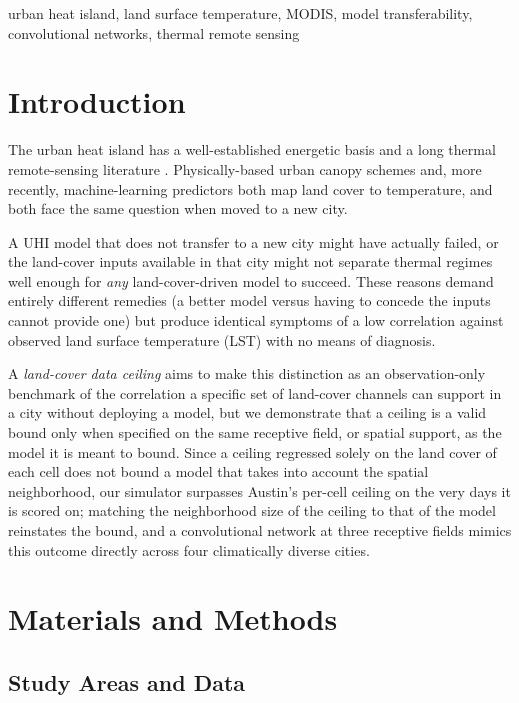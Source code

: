 \begin{IEEEkeywords}
urban heat island, land surface temperature, MODIS, model transferability,
convolutional networks, thermal remote sensing
\end{IEEEkeywords}

\section{Introduction}

The urban heat island has a well-established energetic basis
\cite{oke1982energetic} and a long thermal remote-sensing literature
\cite{voogt2003thermal}. Physically-based urban canopy schemes
\cite{masson2000physically,kusaka2001simple,bueno2013urban} and, more
recently, machine-learning predictors \cite{lyu2022integrated} both map
land cover to temperature, and both face the same question when moved to a
new city.

A UHI model that does not transfer to a new city might have actually failed, or  the land-cover inputs available in that city might not separate thermal regimes well enough for \emph{any} land-cover-driven model to succeed. These reasons demand entirely different remedies (a better model versus having to concede the inputs cannot provide one) but produce identical symptoms of a low correlation against observed land surface temperature (LST) with no means of diagnosis.

A \emph{land-cover data ceiling} aims to make this distinction as an observation-only benchmark of the correlation a specific set of land-cover channels can support in a city without deploying a model, but we demonstrate that a ceiling is a valid bound only when specified on the same receptive field, or spatial support, as the model it is meant to bound. Since a ceiling regressed solely on the land cover of each cell does not bound a model that takes into account the spatial neighborhood, our simulator surpasses Austin's per-cell ceiling on the very days it is scored on; matching the neighborhood size of the ceiling to that of the model reinstates the bound, and a convolutional network at three receptive fields mimics this outcome directly across four climatically diverse cities.


\section{Materials and Methods}

\subsection{Study Areas and Data}

